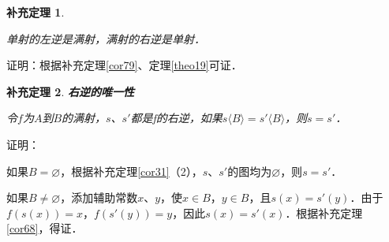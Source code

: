 \documentclass[12pt, a4paper, oneside]{book}
\newtheorem{cor}{补充定理}
\begin{document}
			\begin{cor}\label{cor80}
				\hfill\par
				单射的左逆是满射，满射的右逆是单射．
			\end{cor}
			证明：根据补充定理\ref{cor79}、定理\ref{theo19}可证．
			
			\begin{cor}\label{cor81}
				\textbf{右逆的唯一性}
				\par
				令$f$为$A$到$B$的满射，$s$、$s'$都是f的右逆，如果$s\langle B \rangle =s'\langle B \rangle $，则$s=s'$．
			\end{cor}
			证明：
			\par
			如果$B=\varnothing$，根据补充定理\ref{cor31}（2），$s$、$s'$的图均为$\varnothing$，则$s=s'$．
			\par
			如果$B\neq \varnothing$，添加辅助常数$x$、$y$，使$x\in B$，$y\in B$，且$s(x)=s'(y)$．由于$f(s(x))=x$，$f(s'(y))=y$，因此$s(x)=s'(x)$．根据补充定理\ref{cor68}，得证．
\end{document}
